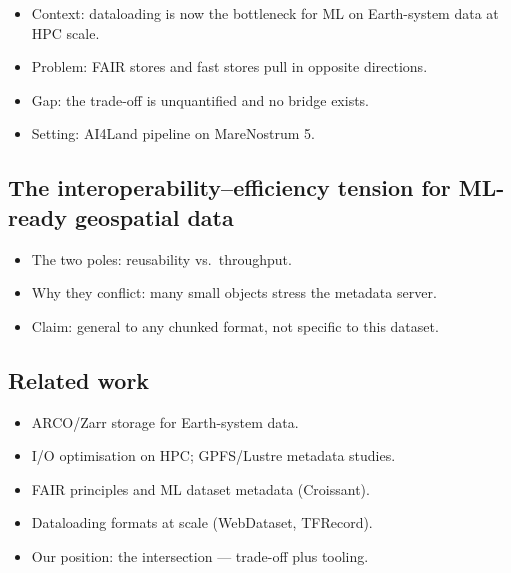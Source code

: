 \documentclass[gmd, manuscript]{copernicus}
\begin{document}
\begin{abstract}
\begin{itemize}
\item Problem: the layout that makes data FAIR is not the layout that trains fast.
\item Two representations: interoperable Zarr store vs.\ training-optimised merged store.
\item Result: $\sim$7$\times$ per-sample, $\sim$4.6$\times$ end-to-end, $\sim$40$\times$ projected.
\item Contribution: an automated bridge, plus the released 1850--2100 land-use cube.
\end{itemize}
\end{abstract}
\introduction  %
\begin{itemize}
\item Context: dataloading is now the bottleneck for ML on Earth-system data at HPC scale.
\item Problem: FAIR stores and fast stores pull in opposite directions.
\item Gap: the trade-off is unquantified and no bridge exists.
\item Setting: AI4Land pipeline on MareNostrum 5.
\end{itemize}

\subsection{The interoperability--efficiency tension for ML-ready geospatial data}
\begin{itemize}
\item The two poles: reusability vs.\ throughput.
\item Why they conflict: many small objects stress the metadata server.
\item Claim: general to any chunked format, not specific to this dataset.
\end{itemize}

\subsection{Related work}
\begin{itemize}
\item ARCO/Zarr storage for Earth-system data.
\item I/O optimisation on HPC; GPFS/Lustre metadata studies.
\item FAIR principles and ML dataset metadata (Croissant).
\item Dataloading formats at scale (WebDataset, TFRecord).
\item Our position: the intersection --- trade-off plus tooling.
\end{itemize}
\end{document}
